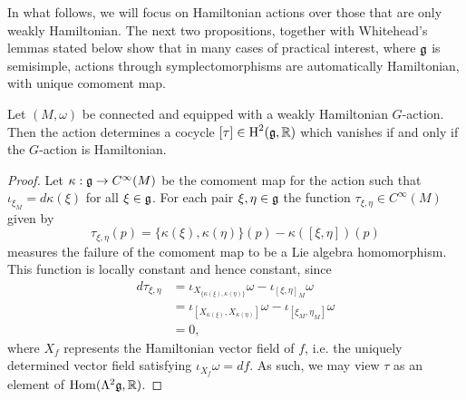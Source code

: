 \documentclass{amsart}
\begin{document}
In what follows, we will focus on Hamiltonian actions over those that are only weakly
Hamiltonian. The next two propositions, together with Whitehead's lemmas stated below show that in
many cases of practical interest, where $\mathfrak g$ is semisimple, actions through symplectomorphisms
are automatically Hamiltonian, with unique comoment map.
\begin{proposition}
    Let $(M,\omega)$ be connected and equipped with a weakly Hamiltonian $G$-action.
    Then the action determines a cocycle $[\tau]\in\operatorname{H}^2(\mathfrak g,\mathbb{R})$ which vanishes
    if and only if the $G$-action is Hamiltonian.
\end{proposition}
\begin{proof}
    Let $\kappa:\mathfrak g\to C^\infty(M)$ be the comoment map for the action such that
    $\iota_{\xi_M}=d\kappa(\xi)$ for all $\xi\in\mathfrak g$. For each pair $\xi,\eta\in\mathfrak g$
    the function $\tau_{\xi,\eta}\in C^\infty(M)$ given by
    \begin{equation*}
        \tau_{\xi,\eta}(p) = \{\kappa(\xi),\kappa(\eta)\}(p)-\kappa([\xi,\eta])(p)
    \end{equation*}
    measures the failure of the comoment map to be a Lie algebra homomorphism.
    This function is locally constant and hence constant, since
    \begin{align*}
        d\tau_{\xi,\eta} &= \iota_{X_{\{\kappa(\xi),\kappa(\eta)\}}}\omega - \iota_{[\xi,\eta]_M}\omega\\
        &= \iota_{[X_{\kappa(\xi)},X_{\kappa(\eta)}]}\omega - \iota_{[\xi_M,\eta_M]}\omega\\
        &= 0,
    \end{align*}
    where $X_f$ represents the Hamiltonian vector field of $f$, i.e. the uniquely determined
    vector field satisfying $\iota_{X_f}\omega = df$. As such, we may view $\tau$ as
    an element of $\operatorname{Hom}(\Lambda^2\mathfrak g,\mathbb{R})$.


\end{proof}
\end{document}
